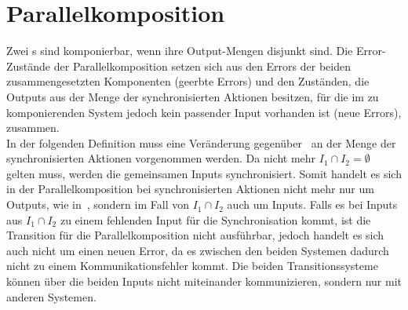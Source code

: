 \section{Parallelkomposition}
Zwei \EIO{}s sind komponierbar, wenn ihre Output-Mengen disjunkt sind. Die
Error-Zustän\-de der Parallelkomposition setzen sich aus den Errors der
beiden zusammengesetzten Komponenten (geerbte Errors) und den Zuständen, die
Outputs aus der Menge der synchronisierten Aktionen besitzen, für die im zu
komponierenden System jedoch kein passender Input vorhanden ist (neue Errors),
zusammen.\\
In der folgenden Definition muss eine Veränderung
gegenüber~\cite{Vogler2014EIO} an der Menge der synchronisierten
Aktionen vorgenommen werden. Da nicht mehr $I_1\cap I_2 =\emptyset$ gelten
muss, werden die gemeinsamen Inputs synchronisiert. Somit handelt es sich in
der Parallelkomposition bei synchronisierten Aktionen nicht mehr nur um
Outputs, wie in~\cite{Vogler2014EIO}, sondern im Fall von $I_1\cap I_2$ auch um
Inputs. Falls es bei Inputs aus $I_1\cap I_2$ zu einem fehlenden Input für die
Synchronisation kommt, ist die Transition für die Parallelkomposition nicht
ausführbar, jedoch handelt es sich auch nicht um einen neuen Error, da es
zwischen den beiden Systemen dadurch nicht zu einem Kommunikationsfehler
kommt. Die beiden Transitionssysteme können über die beiden Inputs nicht
miteinander kommunizieren, sondern nur mit anderen Systemen.

